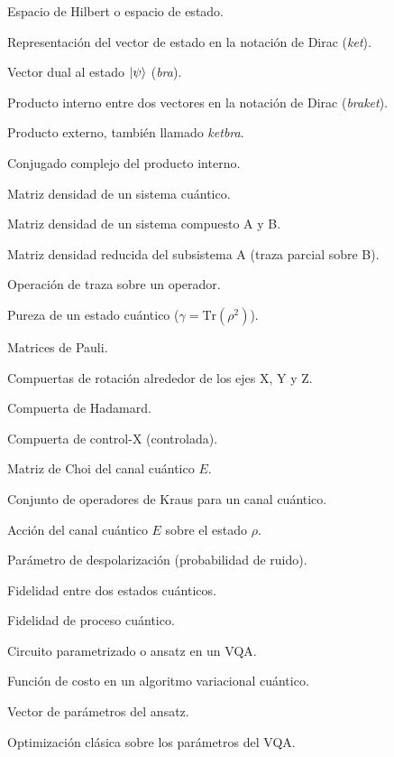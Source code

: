 \documentclass[letterpaper,12pt]{thesisECFM}
\theoremstyle{plain}
\theoremstyle{definition}
\theoremstyle{definition}
\theoremstyle{remark}
\newcommand{\1}{\mathbb{1}}
\begin{document}
\begin{description}[leftmargin=3cm, style=nextline]
  \item[$\mathcal{H}$] Espacio de Hilbert o espacio de estado.
  \item[$\ket{\psi}$] Representación del vector de estado en la notación de Dirac (\textit{ket}).
  \item[$\bra{\psi}$] Vector dual al estado $\ket{\psi}$ (\textit{bra}).
  \item[$\braket{\psi|\phi}$] Producto interno entre dos vectores en la notación de Dirac (\textit{braket}).
  \item[$\ketbra{\psi}{\phi}$] Producto externo, también llamado \textit{ketbra}.
  \item[$\overline{\braket{\psi|\phi}}$] Conjugado complejo del producto interno.
  \item[$\rho$] Matriz densidad de un sistema cuántico.
  \item[$\rho_{AB}$] Matriz densidad de un sistema compuesto A y B.
  \item[$\rho_A = \text{Tr}_B(\rho_{AB})$] Matriz densidad reducida del subsistema A (traza parcial sobre B).
  \item[$\text{Tr}(\cdot)$] Operación de traza sobre un operador.
  \item[$\gamma$] Pureza de un estado cuántico ($\gamma = \text{Tr}(\rho^2)$).
  \item[$\sigma_x, \sigma_y, \sigma_z$] Matrices de Pauli.
  \item[$R_x(\theta), R_y(\theta), R_z(\theta)$] Compuertas de rotación alrededor de los ejes X, Y y Z.
  \item[$H$] Compuerta de Hadamard.
  \item[$\text{CNOT}$] Compuerta de control-X (controlada).
  \item[$\Lambda_E$] Matriz de Choi del canal cuántico $E$.
  \item[$\{E_k\}$] Conjunto de operadores de Kraus para un canal cuántico.
  \item[$E(\rho)$] Acción del canal cuántico $E$ sobre el estado $\rho$.
  \item[$p$] Parámetro de despolarización (probabilidad de ruido).
  \item[$F(\rho, \sigma)$] Fidelidad entre dos estados cuánticos.
  \item[$F_{\text{proc}}$] Fidelidad de proceso cuántico.
  \item[$U(\bm{\theta})$] Circuito parametrizado o ansatz en un VQA.
  \item[$C(\bm{\theta})$] Función de costo en un algoritmo variacional cuántico.
  \item[$\bm{\theta}$] Vector de parámetros del ansatz.
  \item[$\text{argmin}(-C(\bm{\theta}))$] Optimización clásica sobre los parámetros del VQA.
\end{description}
\end{document}
